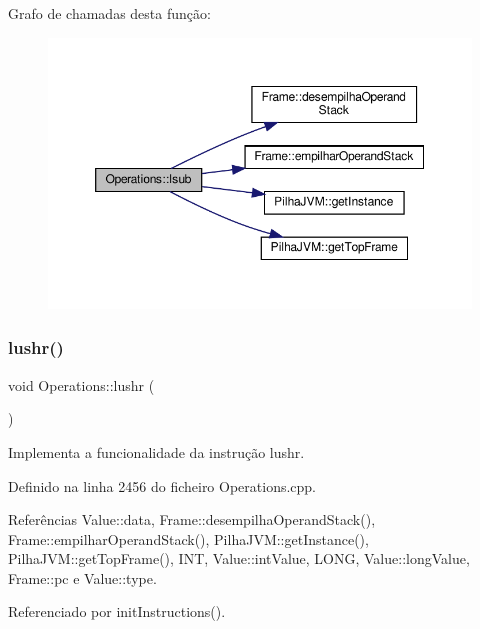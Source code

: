 Grafo de chamadas desta função\+:\nopagebreak
\begin{figure}[H]
\begin{center}
\leavevmode
\includegraphics[width=350pt]{classOperations_a32485b21761b1e5540a6575822a2661a_cgraph}
\end{center}
\end{figure}
\mbox{\label{classOperations_a3b7c61f8bca7b3ad0dacae6649aee042}} 
\subsubsection{\texorpdfstring{lushr()}{lushr()}}
{\footnotesize\ttfamily void Operations\+::lushr (\begin{DoxyParamCaption}{ }\end{DoxyParamCaption})\hspace{0.3cm}{\ttfamily [private]}}



Implementa a funcionalidade da instrução lushr. 



Definido na linha 2456 do ficheiro Operations.\+cpp.



Referências Value\+::data, Frame\+::desempilha\+Operand\+Stack(), Frame\+::empilhar\+Operand\+Stack(), Pilha\+J\+V\+M\+::get\+Instance(), Pilha\+J\+V\+M\+::get\+Top\+Frame(), I\+NT, Value\+::int\+Value, L\+O\+NG, Value\+::long\+Value, Frame\+::pc e Value\+::type.



Referenciado por init\+Instructions().


